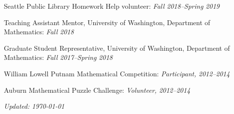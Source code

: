 \documentclass{res}
\begin{document}
\begin{resume}
Seattle Public Library Homework Help volunteer: \textit{Fall 2018--Spring 2019}

Teaching Assistant Mentor, University of Washington, Department of Mathematics: \textit{Fall 2018}

Graduate Student Representative, University of Washington, Department of Mathematics: \textit{Fall 2017--Spring 2018}

William Lowell Putnam Mathematical Competition: \textit{Participant, 2012--2014}

Auburn Mathematical Puzzle Challenge: \textit{Volunteer, 2012--2014}

\vfill

\begin{center}
	\textit{Updated: \today}
\end{center}




\end{resume}
\end{document}
